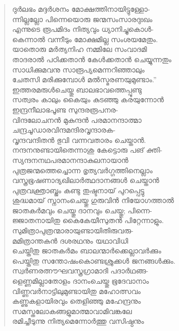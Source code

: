 \begin{verse}
ദുര്‍ലഭം മദ്ദര്‍ശനം മോക്ഷത്തിനായിട്ടുള്ളോ-\\
ന്നില്ലല്ലോ പിന്നെയൊരു ജന്മസംസാരദുഃഖം\\
എന്നുടെ രൂപമിദം നിത്യവും ധ്യാനിച്ചുകൊള്‍-\\
കെന്നാല്‍ വന്നീടും മോക്ഷമില്ല സംശയമേതും.\\
യാതൊരു മര്‍ത്യനിഹ നമ്മിലേ സംവാദമി\\
താദരാല്‍ പഠിക്കതാന്‍ കേള്‍ക്കതാന്‍ ചെയ്യുന്നതും\\
സാധിക്കുമവനു സാരൂപ്യമെന്നറിഞ്ഞാലും\\
ചേതസി മരിക്കുമ്പോള്‍ മല്‍സ്മരണയുമുണ്ടാം.”\\
ഇത്തരമരുള്‍ചെയ്തു ബാലഭാവത്തെപ്പൂണ്ടു\\
സത്വരം കാലും കൈയും കുടഞ്ഞു കരയുന്നോന്‍\\
ഇന്ദ്രനീലാഭപൂണ്ട സുന്ദരരൂപനര-\\
വിന്ദലോചനന്‍ മുകുന്ദന്‍ പരമാനന്ദാത്മാ\\
ചന്ദ്രചൂഡാരവിന്ദമന്ദിരവൃന്ദാരക-\\
വൃന്ദവന്ദിതന്‍ ഭുവി വന്നവതാരം ചെയ്താന്‍.\\
നന്ദനനുണ്ടായിതെന്നാശു കേട്ടൊരു പങ് ക്തി-\\
സ്യന്ദനനഥപരമാനന്ദാകുലനായാന്‍\\
പുത്രജന്മത്തെച്ചൊന്ന ഭൃത്യവര്‍ഗ്ഗത്തിനെല്ലാം\\
വസ്ത്രഭൂഷണാദ്യഖിലാര്‍ത്ഥദാനങ്ങള്‍ ചെയ്താന്‍\\
പുത്രവക്ത്രാബ്ജം കണ്ടു തുഷ്ടനായ് പുറപ്പെട്ടു\\
ശുദ്ധമായ് സ്നാനംചെയ്തു ഗുരുവിന്‍ നിയോഗത്താല്‍\\
ജാതകര്‍മവും ചെയ്തു ദാനവും ചെയ്തു; പിന്നെ-\\
ജ്ജാതനായിതു കൈകേയീസുതന്‍ പിറ്റേന്നാളും.\\
സുമിത്രാപുത്രന്മാരായുണ്ടായിതിരുവരു-\\
മമിത്രാന്തകന്‍ ദശരഥനും യഥാവിധി\\
ചെയ്തിതു ജാതകര്‍മം ബാലന്മാര്‍ക്കെല്ലാവര്‍ക്കും\\
പെയ്തിതു സന്തോഷംകൊണ്ടശ്രുക്കള്‍ ജനങ്ങള്‍ക്കും.\\
സ്വര്‍ണരത്നൗഘവസ്ത്രഗ്രാമാദി പദാര്‍ഥങ്ങ-\\
ളെണ്ണമില്ലാതോളം ദാനംചെയ്തു ഭൂദേവാനാം\\
വിണ്ണവര്‍നാട്ടിലുമുണ്ടായിതു മഹോത്സവം\\
കണ്ണുകളായിരവും തെളിഞ്ഞു മഹേന്ദ്രനും\\
സമസ്തലോകങ്ങളുമാത്മാവാമിവങ്കലേ\\
രമിച്ചീടുന്നു നിത്യമെന്നോര്‍ത്തു വസിഷ്ഠനും\\

\end{verse}
